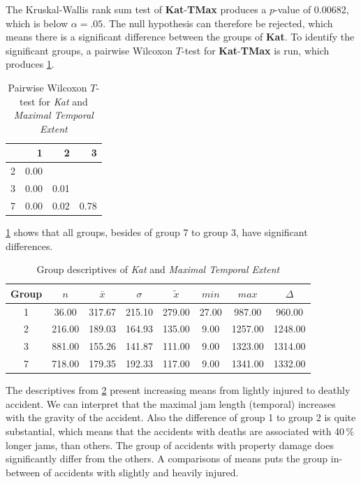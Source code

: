 The Kruskal-Wallis rank sum test of \textbf{Kat}-\textbf{TMax} produces a $p$-value of 0.00682, which is below $\alpha=.05$. The null hypothesis can therefore be rejected, which means there is a significant difference between the groups of \textbf{Kat}. To identify the significant groups, a pairwise Wilcoxon $T$-test for \textbf{Kat}-\textbf{TMax} is run, which produces \cref{tbl:wilcoxon_baysis_matched_Kat_TMax}.
\begin{table}[ht]
	\small
	\centering
	\begin{tabular}{rrrr}
	  	\toprule
	 	& 1 & 2 & 3 \\ 
	  	\midrule
		2 & 0.00 &  &  \\ 
	  	3 & 0.00 & 0.01 &  \\ 
	  	7 & 0.00 & 0.02 & 0.78 \\ 
	   	\bottomrule
	\end{tabular}
	\caption{Pairwise Wilcoxon $T$-test for \textit{Kat} and \textit{Maximal Temporal Extent}}
	\label{tbl:wilcoxon_baysis_matched_Kat_TMax}
\end{table}
\cref{tbl:wilcoxon_baysis_matched_Kat_TMax} shows that all groups, besides of group 7 to group 3, have significant differences. 
\begin{table}[ht]
	\small
	\centering
	\begin{tabular}{c|c|c|c|c|c|c|c}
		\toprule
		Group & $n$ & $\bar{x}$ & $\sigma$ & $\tilde{x}$ & $min$ & $max$ & $\Delta$ \\   
	  	\midrule
		1 & 36.00 & 317.67 & 215.10 & 279.00   & 27.00 & 987.00 & 960.00  \\ 
	  	2 & 216.00 & 189.03 & 164.93 & 135.00 & 9.00 & 1257.00 & 1248.00  \\ 
	  	3 & 881.00 & 155.26 & 141.87 & 111.00 & 9.00 & 1323.00 & 1314.00  \\ 
	  	7 & 718.00 & 179.35 & 192.33 & 117.00  & 9.00 & 1341.00 & 1332.00 \\ 
	   	\bottomrule
	\end{tabular}
	\caption{Group descriptives of \textit{Kat} and \textit{Maximal Temporal Extent}}
	\label{tbl:descriptives_baysis_matched_Kat_TMax}
\end{table}
The descriptives from \cref{tbl:descriptives_baysis_matched_Kat_TMax} present increasing means from lightly injured to deathly accident. We can interpret that the maximal jam length (temporal) increases with the gravity of the accident. Also the difference of group 1 to group 2 is quite substantial, which means that the accidents with deaths are associated with 40\,\% longer jams, than others. The group of accidents with property damage does significantly differ from the others. A comparisons of means puts the group in-between of accidents with slightly and heavily injured.

